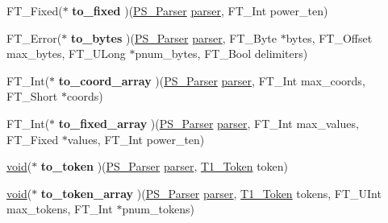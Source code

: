 \begin{DoxyCompactItemize}
\item 
\mbox{\label{struct_p_s___parser___funcs_rec___aa35006d3e089289275d37fe225a3de6c}} 
F\+T\+\_\+\+Fixed($\ast$ {\bfseries to\+\_\+fixed} )(\hyperlink{struct_p_s___parser_rec__}{P\+S\+\_\+\+Parser} \hyperlink{structparser}{parser}, F\+T\+\_\+\+Int power\+\_\+ten)
\item 
\mbox{\label{struct_p_s___parser___funcs_rec___a10c7f67ff642beaa026b19251b4642f6}} 
F\+T\+\_\+\+Error($\ast$ {\bfseries to\+\_\+bytes} )(\hyperlink{struct_p_s___parser_rec__}{P\+S\+\_\+\+Parser} \hyperlink{structparser}{parser}, F\+T\+\_\+\+Byte $\ast$bytes, F\+T\+\_\+\+Offset max\+\_\+bytes, F\+T\+\_\+\+U\+Long $\ast$pnum\+\_\+bytes, F\+T\+\_\+\+Bool delimiters)
\item 
\mbox{\label{struct_p_s___parser___funcs_rec___aa2057732838e9a5669f65e5299aff78e}} 
F\+T\+\_\+\+Int($\ast$ {\bfseries to\+\_\+coord\+\_\+array} )(\hyperlink{struct_p_s___parser_rec__}{P\+S\+\_\+\+Parser} \hyperlink{structparser}{parser}, F\+T\+\_\+\+Int max\+\_\+coords, F\+T\+\_\+\+Short $\ast$coords)
\item 
\mbox{\label{struct_p_s___parser___funcs_rec___a88946710b0c177f3730c49e43abba7ee}} 
F\+T\+\_\+\+Int($\ast$ {\bfseries to\+\_\+fixed\+\_\+array} )(\hyperlink{struct_p_s___parser_rec__}{P\+S\+\_\+\+Parser} \hyperlink{structparser}{parser}, F\+T\+\_\+\+Int max\+\_\+values, F\+T\+\_\+\+Fixed $\ast$values, F\+T\+\_\+\+Int power\+\_\+ten)
\item 
\mbox{\label{struct_p_s___parser___funcs_rec___a03298b95d48251efe9d74d9e1c7bef03}} 
\hyperlink{interfacevoid}{void}($\ast$ {\bfseries to\+\_\+token} )(\hyperlink{struct_p_s___parser_rec__}{P\+S\+\_\+\+Parser} \hyperlink{structparser}{parser}, \hyperlink{struct_t1___token_rec__}{T1\+\_\+\+Token} token)
\item 
\mbox{\label{struct_p_s___parser___funcs_rec___af2bf35eb7dd33653d97f34c6cf1b47bd}} 
\hyperlink{interfacevoid}{void}($\ast$ {\bfseries to\+\_\+token\+\_\+array} )(\hyperlink{struct_p_s___parser_rec__}{P\+S\+\_\+\+Parser} \hyperlink{structparser}{parser}, \hyperlink{struct_t1___token_rec__}{T1\+\_\+\+Token} tokens, F\+T\+\_\+\+U\+Int max\+\_\+tokens, F\+T\+\_\+\+Int $\ast$pnum\+\_\+tokens)

\end{DoxyCompactItemize}

